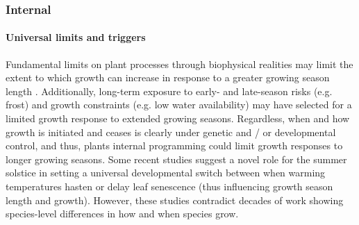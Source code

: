 \documentclass[11pt]{article}
\begin{document}
\subsubsection*{Internal}

\paragraph{Universal limits and triggers} 
Fundamental limits on plant processes through biophysical realities may limit the extent to which growth can increase in response to a greater growing season length \citep[e.g., allometry, chemical reaction limits, and genetic architecture that may limit what trait combinations are possible,][]{ackerly2000evolution}. Additionally, long-term exposure to early- and late-season risks (e.g. frost) and growth constraints (e.g. low water availability) may have selected for a limited growth response to extended growing seasons. Regardless, when and how growth is initiated and ceases is clearly under genetic and / or developmental control, and thus, plants internal programming could limit growth responses to longer growing seasons. Some recent studies suggest a novel role for the summer solstice \citep{zohner2023effect} in setting a universal developmental switch between when warming temperatures hasten or delay leaf senescence (thus influencing growth season length and growth). However, these studies contradict decades of work showing species-level differences in how and when species grow. %
\end{document}
